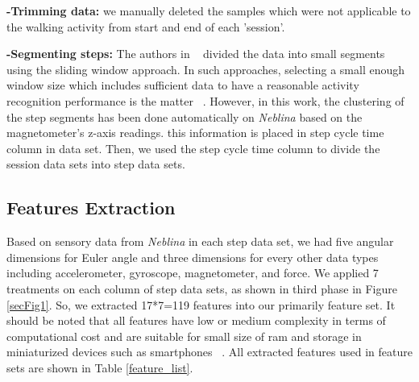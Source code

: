 \textbf{-Trimming data:} we manually deleted the samples which were not applicable to the walking activity from start and end of each 'session'.

\textbf{-Segmenting steps:} The authors in ~\cite{wu2012classification} divided the data into small segments using the sliding window approach. In such approaches, selecting a small enough window size which includes sufficient data to have a reasonable activity recognition performance is the matter ~\cite{s140610146}. However, in this work, the clustering of the step segments has been done automatically on \textit{Neblina} based on the magnetometer's z-axis readings. this information is placed in step cycle time column in data set. Then, we used the step cycle time column to divide the session data sets into step data sets.

\subsection{Features Extraction}
Based on sensory data from \textit{Neblina} in each step data set, we had five angular dimensions for Euler angle and three dimensions for every other data types including accelerometer, gyroscope, magnetometer, and force. We applied 7 treatments on each column of step data sets, as shown in third phase in Figure \ref{secFig1}. So, we extracted 17*7=119 features into our primarily feature set. It should be noted that all features have low or medium complexity in terms of computational cost and are suitable for small size of ram and storage in miniaturized devices such as smartphones ~\cite{figo2010preprocessing}. All extracted features used in feature sets are shown in Table \ref{feature_list}.



